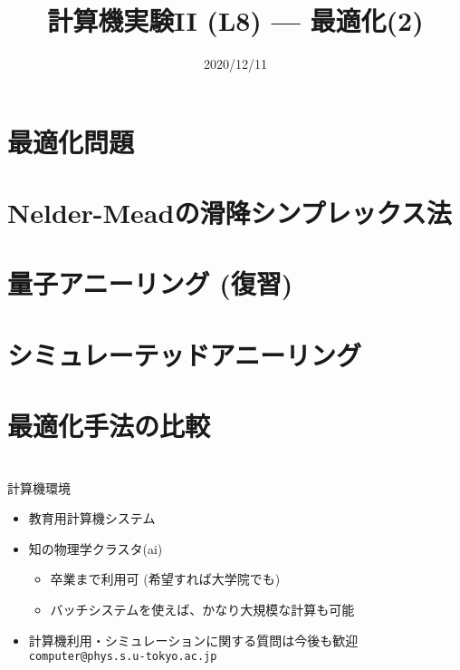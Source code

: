 \documentclass[10pt,dvipdfmx]{beamer}
\title{計算機実験II (L8) --- 最適化(2)}
\date{2020/12/11}
\begin{document}
\begin{frame}
  \titlepage
  \tableofcontents
\end{frame}



\section{最適化問題}




\section{Nelder-Meadの滑降シンプレックス法}




\section{量子アニーリング (復習)}




\section{シミュレーテッドアニーリング}





\section{最適化手法の比較}








\section{}

\begin{frame}[t,fragile]{計算機環境}
  \begin{itemize}
  \item 教育用計算機システム
  \item 知の物理学クラスタ(ai)
    \begin{itemize}
    \item 卒業まで利用可 (希望すれば大学院でも)
    \item バッチシステムを使えば、かなり大規模な計算も可能
    \end{itemize}
  \item 計算機利用・シミュレーションに関する質問は今後も歓迎 {\tt computer@phys.s.u-tokyo.ac.jp}
  \end{itemize}
\end{frame}
\end{document}
